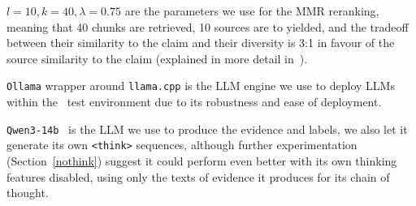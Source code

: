 $l=10, k=40, \lambda=0.75$ are the parameters we use for the MMR reranking, meaning that 40 chunks are retrieved, 10 sources are to yielded, and the tradeoff between their similarity to the claim and their diversity is 3:1 in favour of the source similarity to the claim (explained in more detail in~\citealt{ullrich-etal-2024-aic}). 

\texttt{Ollama} wrapper around \texttt{llama.cpp} is the LLM engine we use to deploy LLMs within the \averitec~test environment due to its robustness and ease of deployment.

\texttt{Qwen3-14b}~\cite{yang2025qwen3technicalreport} is the LLM we use to produce the evidence and labels, we also let it generate its own \texttt{<think>} sequences, although further experimentation (Section~\ref{nothink}) suggest it could perform even better with its own thinking features disabled, using only the texts of evidence it produces for its chain of thought.
